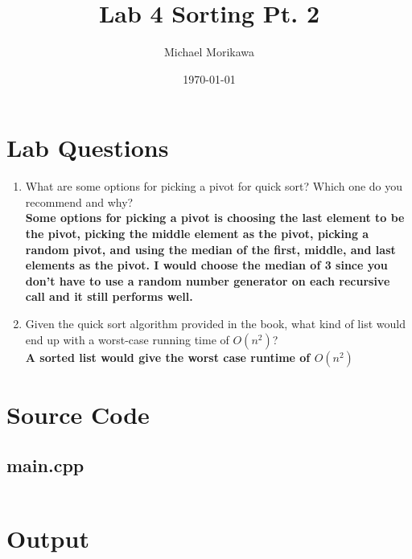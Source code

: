 \documentclass{article}
\title{Lab 4 Sorting Pt. 2}
\author{Michael Morikawa}
\date{\today}
\begin{document}
    \maketitle
    \section{Lab Questions}
    \begin{enumerate}[label=\textbf{Question \arabic*}]
        \item What are some options for picking a pivot for quick sort? Which one
        do you recommend and why?\\
        \textbf{Some options for picking a pivot is choosing the last element to be the pivot,
         picking the middle element as the pivot, picking a random pivot, and using the median of
         the first, middle, and last elements as the pivot. I would choose the median of 3 since 
         you don't have to use a random number generator on each recursive call and it still performs well.}

        \item Given the quick sort algorithm provided in the book, what kind of list
would end up with a worst-case running time of $O(n^2)$?
\\
        \textbf{A sorted list would give the worst case runtime of $O(n^2)$}
    \end{enumerate}

    \section{Source Code}
    \subsection{main.cpp}
    \inputminted{c++}{../src/main.cpp}

    \section{Output}
\end{document}
